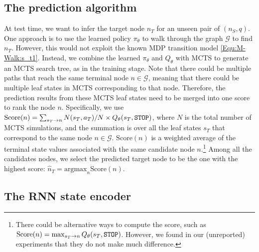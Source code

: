 \documentclass{article}
\newcommand{\mc}{\mathcal}
\newcommand{\argmax}{\mathrm{argmax}}
\newcommand{\modelname}{M-Walk}
\begin{document}
	
	
	
\subsection{The prediction algorithm}
\label{Sec:\modelname:Test}
	
	At test time, we want to infer the target node $n_T$ for an unseen pair of $(n_S, q)$. One approach is to use the learned policy $\pi_{\theta}$ to walk through the graph $\mc{G}$ to find $n_T$. However, this would not exploit the known MDP transition model \eqref{Equ:\modelname:s_t1}. Instead, we combine the learned $\pi_{\theta}$ and $Q_{\theta}$ with MCTS to generate an MCTS search tree, as in the training stage. Note that there could be multiple paths that reach the same terminal node $n \in \mc{G}$, meaning that there could be multiple leaf states in MCTS corresponding to that node. Therefore, the prediction results from these MCTS leaf states need to be merged into one score to rank the node $n$. Specifically, we use
	$\mathrm{Score}(n) = \textstyle \sum_{ s_T \rightarrow n} N(s_T, a_T)/{N} \times Q_{\theta}(s_T,\tt{STOP})$,    
where $N$ is the total number of MCTS simulations, and the summation is over all the leaf states $s_T$ that correspond to the same node $n \in \mc{G}$. 
    $\mathrm{Score}(n)$ is a weighted average of the terminal state values associated with the same candidate node $n$.\footnote{There could be alternative ways to compute the score, such as $\mathrm{Score}(n) = \max_{s_T \rightarrow n} Q_{\theta}(s_T,\tt{STOP})$. However, we found in our (unreported) experiments that they do not make much difference.} Among all the candidates nodes, we select the predicted target node to be the one with the highest score: $\hat{n}_T = \argmax_{n} \mathrm{Score}(n)$.
	
	
	
	
	
	
\subsection{The RNN state encoder}
\label{Sec:\modelname:RNNStateEncoder}
	
\end{document}
